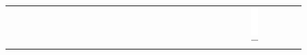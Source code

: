 \documentclass[10pt]{article}
\begin{document}
\begin{center}
\begin{tabular}{|c|c|c|c|c|c|c|c|c|c|c|c|c|c|c|c|c|c|c|c|c|c|c|c|c|c|c|c|c|c|}
 &  &  &  &  &  &  &  &  &  &  &  &  &  &  &  &  &  &  &  &  &  &  &  &  & \includegraphics[max width=\textwidth]{2024_11_21_e15da647cf0a41077ac3g-10(1)}

\end{tabular}
\end{center}
\end{document}
